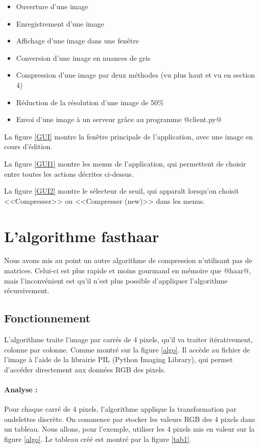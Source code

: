 \documentclass{article}
\begin{document}
\begin{itemize}
\item Ouverture d'une image
\item Enregistrement d'une image
\item Affichage d'une image dans une fenêtre
\item Conversion d'une image en nuances de gris
\item Compression d'une image par deux méthodes (vu plus haut et vu en section 4)
\item Réduction de la résolution d'une image de 50\%
\item Envoi d'une image à un serveur grâce au programme @client.py@
\end{itemize}

La figure \ref{GUI} montre la fenêtre principale de l'application, avec une image en cours d'édition.


La figure \ref{GUI1} montre les menus de l'application, qui permettent de choisir entre toutes les actions décrites ci-dessus.


La figure \ref{GUI2} montre le sélecteur de seuil, qui apparaît lorsqu'on choisit <<Compresser>> ou <<Compresser (new)>> dans les menus.


\section{L'algorithme fasthaar}

Nous avons mis au point un autre algorithme de compression n'utilisant pas de matrices. Celui-ci est plus rapide et moins gourmand en mémoire que @haar@, mais l'inconvénient est qu'il n'est plus possible d'appliquer l'algorithme récursivement.

\subsection{Fonctionnement}

L'algorithme traite l'image par carrés de 4 pixels, qu'il va traiter itérativement, colonne par colonne. Comme montré sur la figure \ref{algo}. Il accède au fichier de l'image à l'aide de la librairie PIL (Python Imaging Library), qui permet d'accéder directement aux données RGB des pixels.


\paragraph{Analyse :}

Pour chaque carré de 4 pixels, l'algorithme applique la transformation par ondelettes discrète. On commence par stocker les valeurs RGB des 4 pixels dans un tableau. Nous allons, pour l'exemple, utiliser les 4 pixels mis en valeur sur la figure \ref{algo}. Le tableau créé est montré par la figure \ref{tab1}.
\end{document}
